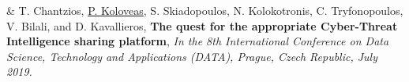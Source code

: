 
& T. Chantzios, \underline{P. Koloveas}, S. Skiadopoulos, N. Kolokotronis, C. Tryfonopoulos, V. Bilali, and D. Kavallieros, \textbf{The quest for the appropriate Cyber-Threat Intelligence sharing platform}, \textit{In the 8th International Conference on Data Science, Technology and Applications (DATA), Prague, Czech Republic, July 2019.}\\


